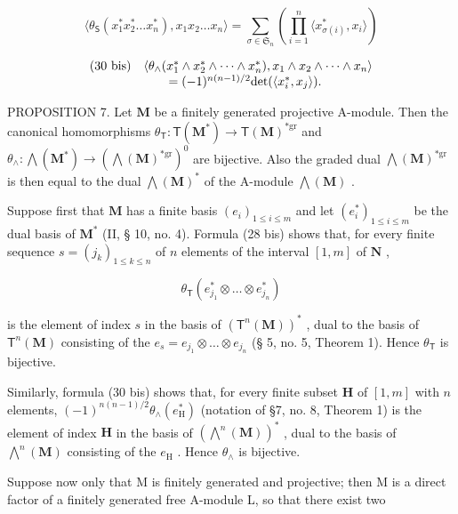 \[
\langle \theta_ {\mathsf {S}} (x _ {1} ^ {*} x _ {2} ^ {*} \dots x _ {n} ^ {*}), x _ {1} x _ {2} \dots x _ {n} \rangle = \sum_ {\sigma \in \mathfrak {S} _ {n}} \left(\prod_ {i = 1} ^ {n} \langle x _ {\sigma (i)} ^ {*}, x _ {i} \rangle\right)\tag{29 bis}
\]

\[
\begin{array}{r l} (30 \text { bis}) &\langle \theta_ {\wedge} (x _ {1} ^ {*} \wedge x _ {2} ^ {*} \wedge \dots \wedge x _ {n} ^ {*}), x _ {1} \wedge x _ {2} \wedge \dots \wedge x _ {n} \rangle \\ & \qquad = (- 1) ^ {n (n - 1) / 2} \mathrm{det} (\langle x _ {i} ^ {*}, x _ {j} \rangle). \end{array}
\]

PROPOSITION 7. Let \(\mathbf{M}\) be a finitely generated projective A-module. Then the canonical homomorphisms \(\theta_{\mathsf{T}}: \mathsf{T}(\mathbf{M}^{*}) \to \mathsf{T}(\mathbf{M})^{*\mathrm{gr}}\) and \(\theta_{\wedge}: \bigwedge (\mathbf{M}^{*}) \to (\bigwedge (\mathbf{M})^{*\mathrm{gr}})^{0}\) are bijective. Also the graded dual \(\bigwedge (\mathbf{M})^{*\mathrm{gr}}\) is then equal to the dual \(\bigwedge (\mathbf{M})^{*}\) of the A-module \(\bigwedge (\mathbf{M})\) .

Suppose first that \(\mathbf{M}\) has a finite basis \((e_i)_{1\leq i\leq m}\) and let \((e_i^*)_{1\leq i\leq m}\) be the dual basis of \(\mathbf{M}^*\) (II, § 10, no. 4). Formula (28 bis) shows that, for every finite sequence \(s = (j_k)_{1\leq k\leq n}\) of \(n\) elements of the interval \([1,m]\) of \(\mathbf{N}\) ,

\[
\theta_ {\mathsf {T}} (e _ {j _ {1}} ^ {*} \otimes \dots \otimes e _ {j _ {n}} ^ {*})
\]

is the element of index \(s\) in the basis of \((\mathsf{T}^n (\mathbf{M}))^*\) , dual to the basis of \(\mathsf{T}^n (\mathbf{M})\) consisting of the \(e_s = e_{j_1}\otimes \dots \otimes e_{j_n}\) (§ 5, no. 5, Theorem 1). Hence \(\theta_{\mathsf{T}}\) is bijective.

Similarly, formula (30 bis) shows that, for every finite subset \(\mathbf{H}\) of \([1, m]\) with \(n\) elements, \((-1)^{n(n-1)/2} \theta_{\wedge}(e_{\mathrm{H}}^{*})\) (notation of §7, no. 8, Theorem 1) is the element of index \(\mathbf{H}\) in the basis of \((\bigwedge^{n}(\mathbf{M}))^{*}\) , dual to the basis of \(\bigwedge^{n}(\mathbf{M})\) consisting of the \(e_{\mathrm{H}}\) . Hence \(\theta_{\wedge}\) is bijective.

Suppose now only that M is finitely generated and projective; then M is a direct factor of a finitely generated free A-module L, so that there exist two

